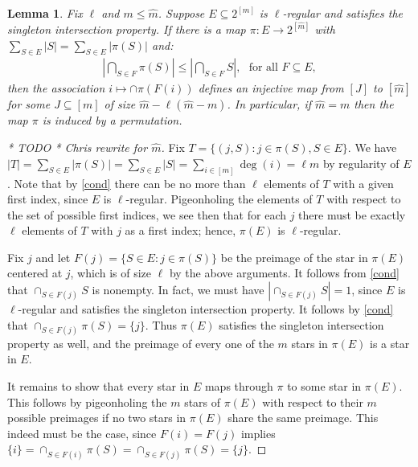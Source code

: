 \documentclass[9pt,twocolumn]{pnas-new}
\newtheorem{lemma}{Lemma}
\begin{document}
\begin{lemma}\label{NonEmptyLemma} 
Fix $\ell$ and $m \leq \hat m$. Suppose $E \subseteq 2^{[m]}$ is $\ell$-regular and satisfies the singleton intersection property. If there is a map $\pi: E \to 2^{[\hat m]}$ with $\sum_{S \in E} |S| = \sum_{S \in E} |\pi(S)|$ and:
\begin{align}\label{cond}
|\bigcap_{S \in F} \pi(S)| \leq |\bigcap_{S \in F} S |,\ \ \   \text{for all } F \subseteq E,
\end{align}
%
then the association $i \mapsto \cap \pi(F(i))$ defines an injective map from $[J]$ to $[\hat m]$ for some $J \subseteq [m]$ of size $\hat m - \ell(\hat m - m)$. In particular, if $\hat m = m$ then the map $\pi$ is induced by a permutation.
\end{lemma}
\begin{proof}
[* TODO * Chris rewrite for $\hat m$] Fix $T = \{(j, S): j \in \pi(S), S \in E\}$. We have $|T| = \sum_{S \in E} |\pi(S)| = \sum_{S \in E} |S| = \sum_{i \in [m]} \deg(i) = \ell m$ by regularity of $E$. Note that by \eqref{cond} there can be no more than $\ell$ elements of $T$ with a given first index, since $E$ is $\ell$-regular. Pigeonholing the elements of $T$ with respect to the set of possible first indices, we see then that for each $j$ there must be exactly $\ell$ elements of $T$ with $j$ as a first index; hence, $\pi(E)$ is $\ell$-regular. 

Fix $j$ and let $F(j) = \{S \in E: j \in \pi(S)\}$ be the preimage of the star in $\pi(E)$ centered at $j$, which is of size $\ell$ by the above arguments. It follows from \eqref{cond} that $\cap_{S \in F(j)} S$ is nonempty. In fact, we must have $|\cap _{S \in F(j)} S| = 1$, since $E$ is $\ell$-regular and satisfies the singleton intersection property. It follows by \eqref{cond} that $\cap_{S \in F(j)} \pi(S) = \{j\}$. Thus $\pi(E)$ satisfies the singleton intersection property as well, and the preimage of every one of the $m$ stars in $\pi(E)$ is a star in $E$.

It remains to show that every star in $E$ maps through $\pi$ to some star in $\pi(E)$. This follows by pigeonholing the $m$ stars of $\pi(E)$ with respect to their $m$ possible preimages if no two stars in $\pi(E)$ share the same preimage. This indeed must be the case, since $F(i) = F(j)$ implies $\{i\} = \cap_{S \in F(i)} \pi(S) = \cap_{S \in F(j)} \pi(S) = \{j\}$.
\end{proof}
\end{document}
